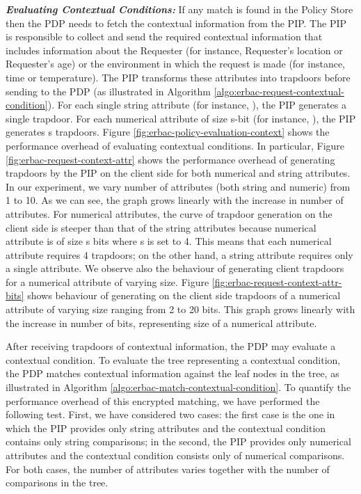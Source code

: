 \documentclass[epsfig,a4paper,11pt,titlepage]{book}
\numberwithin{algorithm}{chapter}
\begin{document}
\noindent \emph{\textbf{Evaluating Contextual Conditions:}}
If any match is found in the Policy Store then the \gls{PDP} needs to fetch the contextual information from the \gls{PIP}. The \gls{PIP} is responsible to collect and send the required contextual information that includes information about the Requester (for instance, Requester's location or Requester's age) or the environment in which the request is made (for instance, time or temperature). The \gls{PIP} transforms these attributes into trapdoors before sending to the \gls{PDP} (as illustrated in Algorithm \ref{algo:erbac-request-contextual-condition}). For each single string attribute (for instance, ), the \gls{PIP} generates a single trapdoor. For each numerical attribute of size s-bit (for instance, ), the \gls{PIP} generates s trapdoors. Figure \ref{fig:erbac-policy-evaluation-context} shows the performance overhead of evaluating contextual conditions. In particular, Figure \ref{fig:erbac-request-context-attr} shows the performance overhead of generating trapdoors by the \gls{PIP} on the client side for both numerical and string attributes. In our experiment, we vary number of attributes (both string and numeric) from 1 to 10. As we can see, the graph grows linearly with the increase in number of attributes. For numerical attributes, the curve of trapdoor generation on the client side is steeper than that of the string attributes because numerical attribute is of size s bits where s is set to 4. This means that each numerical attribute requires 4 trapdoors; on the other hand, a string attribute requires only a single attribute. We observe also the behaviour of generating client trapdoors for a numerical attribute of varying size. Figure \ref{fig:erbac-request-context-attr-bits} shows behaviour of generating on the client side trapdoors of a numerical attribute of varying size ranging from 2 to 20 bits. This graph grows linearly with the increase in number of bits, representing size of a numerical attribute.

After receiving trapdoors of contextual information, the \gls{PDP} may evaluate a contextual condition. To evaluate the tree representing a contextual condition, the \gls{PDP} matches contextual information against the leaf nodes in the tree, as illustrated in Algorithm \ref{algo:erbac-match-contextual-condition}. To quantify the performance overhead of this encrypted matching, we have performed the following test. First, we have considered two cases: the first case is the one in which the \gls{PIP} provides only string attributes and the contextual condition contains only string comparisons; in the second, the \gls{PIP} provides only numerical attributes and the contextual condition consists only of numerical comparisons. For both cases, the number of attributes varies together with the number of comparisons in the tree. 
\end{document}
